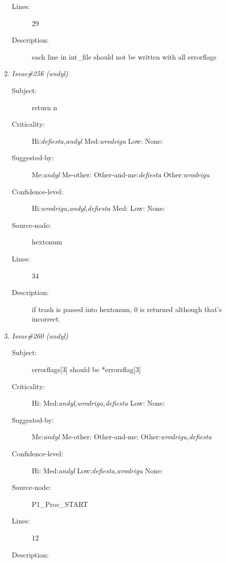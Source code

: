 \begin{enumerate}
\begin{description}
\item [Lines:] 29

\item [Description:] each line in int\_file should not be written
with all errorflags
\end{description}
\item {\it Issue\#256 (andyl)}
\begin{description}
\item [Subject:] return n
\item [Criticality:] Hi:{\it defiesta,andyl} Med:{\it wrodrigu} Low:{\it } None:{\it }
\item [Suggested-by:] Me:{\it andyl} Me-other:{\it } Other-and-me:{\it defiesta} Other:{\it wrodrigu}
\item [Confidence-level:] Hi:{\it wrodrigu,andyl,defiesta} Med:{\it } Low:{\it } None:{\it }
\item [Source-node:] hextonum

\item [Lines:] 34

\item [Description:] if trash is passed into hextonum, 0 is
returned although that's incorrect.
\end{description}
\item {\it Issue\#260 (andyl)}
\begin{description}
\item [Subject:] errorflags[3] should be *errorsflag[3]
\item [Criticality:] Hi:{\it } Med:{\it andyl,wrodrigu,defiesta} Low:{\it } None:{\it }
\item [Suggested-by:] Me:{\it andyl} Me-other:{\it } Other-and-me:{\it } Other:{\it wrodrigu,defiesta}
\item [Confidence-level:] Hi:{\it } Med:{\it andyl} Low:{\it defiesta,wrodrigu} None:{\it }
\item [Source-node:] P1\_Proc\_START

\item [Lines:] 12

\item [Description:] 
\end{description}
\end{enumerate}

